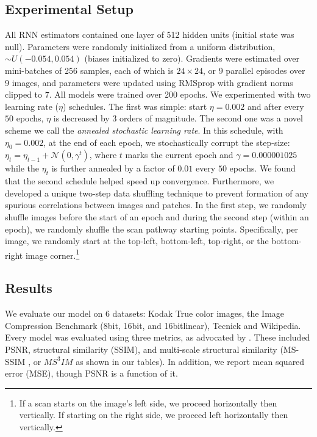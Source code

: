 \documentclass[smallabstract,smallcaptions]{dccpaper}
\begin{document}
\subsection{Experimental Setup}
\label{exp:design}
All RNN estimators contained one layer of 512 hidden units (initial state was null). Parameters were randomly initialized from a uniform distribution, $\sim U(-0.054, 0.054)$ (biases initialized to zero). Gradients were estimated over mini-batches of 256 samples, each of which is $24 \times 24$, or 9 parallel episodes over 9 images, and parameters were updated using RMSprop {\cite{Tieleman2012}} with gradient norms clipped to 7. All models were trained over 200 epochs. We experimented with two learning rate ($\eta$) schedules. The first was simple: start $\eta = 0.002$ and after every $50$ epochs, $\eta$ is decreased by $3$ orders of magnitude.
The second one was a novel scheme we call the \emph{annealed stochastic learning rate}. In this schedule, with $\eta_0 = 0.002$, at the end of each epoch, we stochastically corrupt the step-size: $\eta_t  = \eta_{t-1} + \mathcal{N}(0,\gamma^{t})$, where $t$ marks the current epoch and $\gamma = 0.000001025$ while the $\eta_t$ is further annealed by a factor of $0.01$ every $50$ epochs. We found that the second schedule helped speed up convergence. Furthermore, we developed a unique two-step data shuffling technique to prevent formation of any spurious correlations between images and patches. In the first step, we randomly shuffle images before the start of an epoch and during the second step (within an epoch), we randomly shuffle the scan pathway starting points. Specifically, per image, we randomly start at the top-left, bottom-left, top-right, or the bottom-right image corner.\footnote{If a scan starts on the image's left side, we proceed horizontally then vertically. If starting on the right side, we proceed left horizontally then vertically.}   %



\subsection{Results}
We evaluate our model on 6 datasets: Kodak True color images, the Image Compression Benchmark (8bit, 16bit, and 16bitlinear), Tecnick and Wikipedia. Every model was evaluated using three metrics, as advocated by \cite{ma2016group}. These included PSNR, structural similarity (SSIM), and multi-scale structural similarity (MS-SSIM \cite{wang2004imagequality}, or $MS^3IM$ as shown in our tables). In addition, we report mean squared error (MSE), though PSNR is a function of it.
\end{document}
